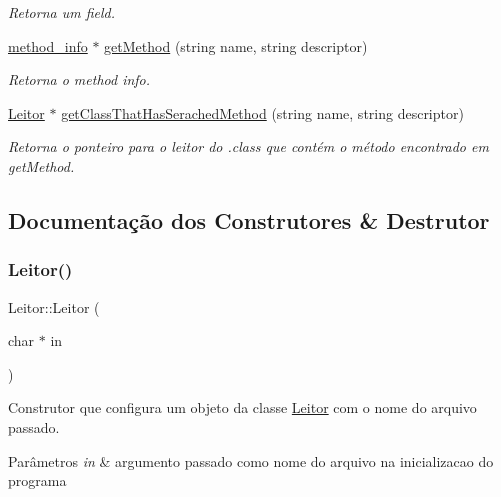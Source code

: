 \begin{DoxyCompactItemize}
\begin{DoxyCompactList}\small\item\em Retorna um field. \end{DoxyCompactList}\item 
\hyperlink{structmethod__info}{method\+\_\+info} $\ast$ \hyperlink{classLeitor_a721a60b281566287c7845c52a667ecc1}{get\+Method} (string name, string descriptor)
\begin{DoxyCompactList}\small\item\em Retorna o method info. \end{DoxyCompactList}\item 
\hyperlink{classLeitor}{Leitor} $\ast$ \hyperlink{classLeitor_a568b259f176676472196ad0fb127c4f2}{get\+Class\+That\+Has\+Serached\+Method} (string name, string descriptor)
\begin{DoxyCompactList}\small\item\em Retorna o ponteiro para o leitor do .class que contém o método encontrado em get\+Method. \end{DoxyCompactList}\end{DoxyCompactItemize}


\subsection{Documentação dos Construtores \& Destrutor}
\mbox{\label{classLeitor_a0a1e8b666d75c2fd2c112affc0a8f55a}} 
\subsubsection{\texorpdfstring{Leitor()}{Leitor()}\hspace{0.1cm}{\footnotesize\ttfamily [1/2]}}
{\footnotesize\ttfamily Leitor\+::\+Leitor (\begin{DoxyParamCaption}\item[{char $\ast$}]{in }\end{DoxyParamCaption})}

Construtor que configura um objeto da classe \hyperlink{classLeitor}{Leitor} com o nome do arquivo passado.


\begin{DoxyParams}{Parâmetros}
{\em in} & argumento passado como nome do arquivo na inicializacao do programa \\
\hline
\end{DoxyParams}
\mbox{\label{classLeitor_a0ab1016df547c6e5081607b916eb7825}} 
